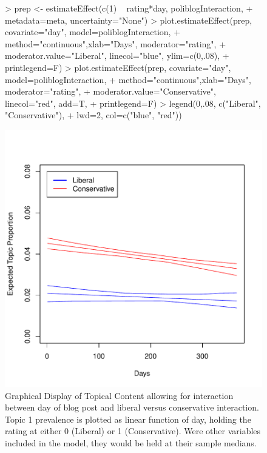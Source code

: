 \documentclass[nojss]{jss}
\begin{document}
\begin{Schunk}
\end{Schunk}

\begin{figure}
\begin{center}
\begin{Schunk}
\begin{Sinput}
> prep <- estimateEffect(c(1) ~ rating*day, poliblogInteraction,
+         metadata=meta, uncertainty="None")
> plot.estimateEffect(prep, covariate="day", model=poliblogInteraction,
+         method="continuous",xlab="Days", moderator="rating",
+         moderator.value="Liberal", linecol="blue", ylim=c(0,.08), 
+         printlegend=F)
> plot.estimateEffect(prep, covariate="day", model=poliblogInteraction,
+         method="continuous",xlab="Days", moderator="rating",
+         moderator.value="Conservative", linecol="red", add=T, 
+         printlegend=F)
> legend(0,.08, c("Liberal", "Conservative"), 
+        lwd=2, col=c("blue", "red"))
\end{Sinput}
\end{Schunk}
\includegraphics{stmVignette-022}
\caption{Graphical Display of Topical Content allowing for interaction between day of blog post and liberal versus conservative interaction. Topic 1 prevalence is plotted as linear function of day, holding the rating at either 0 (Liberal) or 1 (Conservative). Were other variables included in the model, they would be held at their sample medians.}
\label{fig:spline2}
\end{center}
\end{figure}
\end{document}
